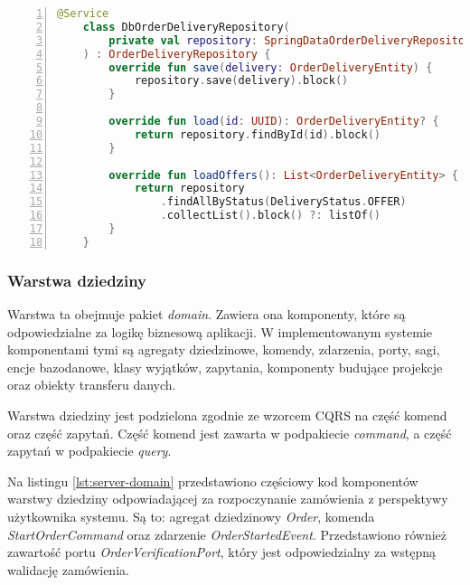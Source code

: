 \begin{lstlisting}[caption={Przykładowy kod implementacji repozytorium bazodanowego},label={lst:server-out-adapter},captionpos=b,language=Kotlin,numbers=left]
    @Service
    class DbOrderDeliveryRepository(
        private val repository: SpringDataOrderDeliveryRepository
    ) : OrderDeliveryRepository {
        override fun save(delivery: OrderDeliveryEntity) {
            repository.save(delivery).block()
        }
    
        override fun load(id: UUID): OrderDeliveryEntity? {
            return repository.findById(id).block()
        }
    
        override fun loadOffers(): List<OrderDeliveryEntity> {
            return repository
                .findAllByStatus(DeliveryStatus.OFFER)
                .collectList().block() ?: listOf()
        }
    }
\end{lstlisting}

\subsubsection{Warstwa dziedziny} 

Warstwa ta obejmuje pakiet \textit{domain}. Zawiera ona komponenty, które są odpowiedzialne za logikę biznesową aplikacji. W implementowanym systemie komponentami tymi są agregaty dziedzinowe, komendy, zdarzenia, porty, sagi, encje bazodanowe, klasy wyjątków, zapytania, komponenty budujące projekcje oraz obiekty transferu danych.

Warstwa dziedziny jest podzielona zgodnie ze wzorcem CQRS na część komend oraz część zapytań. Część komend jest zawarta w podpakiecie \textit{command}, a część zapytań w podpakiecie \textit{query}.

Na listingu \ref{lst:server-domain} przedstawiono częściowy kod komponentów warstwy dziedziny odpowiadającej za rozpoczynanie zamówienia z perspektywy użytkownika systemu. Są to: agregat dziedzinowy \textit{Order}, komenda \textit{StartOrderCommand} oraz zdarzenie \textit{OrderStartedEvent}. Przedstawiono również zawartość portu \textit{OrderVerificationPort}, który jest odpowiedzialny za wstępną walidację zamówienia.

